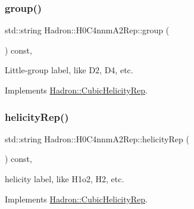 \mbox{\label{structHadron_1_1H0C4nnmA2Rep_a04d0d1b6a859d992423de875ce86f980}} 
\subsubsection{\texorpdfstring{group()}{group()}\hspace{0.1cm}{\footnotesize\ttfamily [5/5]}}
{\footnotesize\ttfamily std\+::string Hadron\+::\+H0\+C4nnm\+A2\+Rep\+::group (\begin{DoxyParamCaption}{ }\end{DoxyParamCaption}) const\hspace{0.3cm}{\ttfamily [inline]}, {\ttfamily [virtual]}}

Little-\/group label, like D2, D4, etc. 

Implements \mbox{\hyperlink{structHadron_1_1CubicHelicityRep_a101a7d76cd8ccdad0f272db44b766113}{Hadron\+::\+Cubic\+Helicity\+Rep}}.

\mbox{\label{structHadron_1_1H0C4nnmA2Rep_ace5618f2fa58722ccfaa15a545339f88}} 
\subsubsection{\texorpdfstring{helicityRep()}{helicityRep()}\hspace{0.1cm}{\footnotesize\ttfamily [1/3]}}
{\footnotesize\ttfamily std\+::string Hadron\+::\+H0\+C4nnm\+A2\+Rep\+::helicity\+Rep (\begin{DoxyParamCaption}{ }\end{DoxyParamCaption}) const\hspace{0.3cm}{\ttfamily [inline]}, {\ttfamily [virtual]}}

helicity label, like H1o2, H2, etc. 

Implements \mbox{\hyperlink{structHadron_1_1CubicHelicityRep_af1096946b7470edf0a55451cc662f231}{Hadron\+::\+Cubic\+Helicity\+Rep}}.

\mbox{\label{structHadron_1_1H0C4nnmA2Rep_ace5618f2fa58722ccfaa15a545339f88}} 
